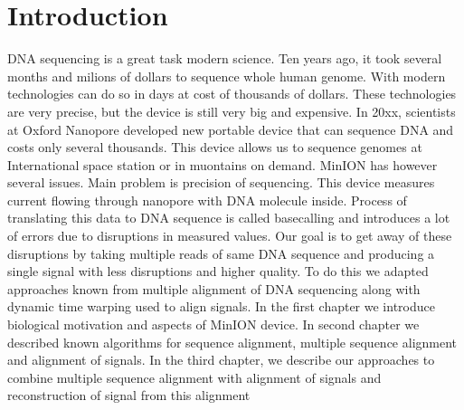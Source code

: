 \chapter*{Introduction} %

DNA sequencing is a great task modern science. Ten years ago, it took several months and milions of dollars to sequence whole human genome. With modern technologies can do so in days at cost of thousands of dollars.
These technologies are very precise, but the device is still very big and expensive.
In 20xx, scientists at Oxford Nanopore developed new portable device that can sequence DNA and costs only several thousands. This device allows us to sequence genomes at International space station or in muontains on demand. MinION has however several issues. Main problem is precision of sequencing. This device measures current flowing through nanopore with DNA molecule inside. Process of translating this data to DNA sequence is called basecalling and introduces a lot of errors due to disruptions in measured values. Our goal is to get away of these disruptions by taking multiple reads of same DNA sequence and producing a single signal with less disruptions and higher quality. To do this we adapted approaches known from multiple alignment of DNA sequencing along with dynamic time warping  used to align signals.
In the first chapter we introduce biological motivation and aspects of MinION device. In second chapter we described known algorithms for sequence alignment, multiple sequence alignment and alignment of signals.
In the third chapter, we describe our approaches to combine multiple sequence alignment with alignment of signals and reconstruction of signal from this alignment